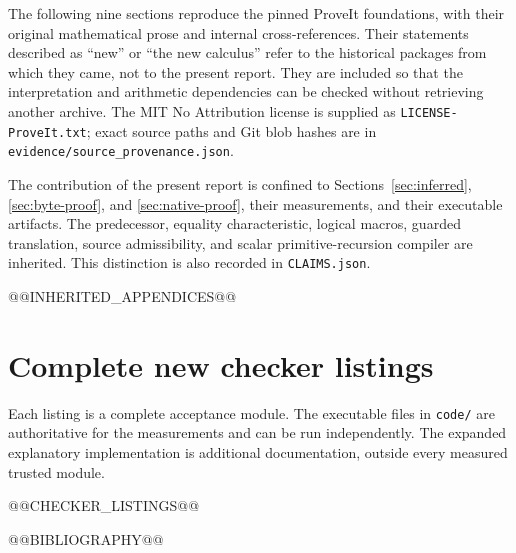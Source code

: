 The following nine sections reproduce the pinned ProveIt foundations,
with their original mathematical prose and internal cross-references.
Their statements described as ``new'' or ``the new calculus'' refer to
the historical packages from which they came, not to the present report.
They are included so that the interpretation and arithmetic dependencies
can be checked without retrieving another archive. The MIT No Attribution
license is supplied as \texttt{LICENSE-ProveIt.txt}; exact source paths and
Git blob hashes are in \texttt{evidence/source\_provenance.json}.

The contribution of the present report is confined to
Sections~\ref{sec:inferred}, \ref{sec:byte-proof}, and
\ref{sec:native-proof}, their measurements, and their executable artifacts.
The predecessor, equality characteristic, logical macros, guarded
translation, source admissibility, and scalar primitive-recursion
compiler are inherited. This distinction is also recorded in
\texttt{CLAIMS.json}.

@@INHERITED_APPENDICES@@

\clearpage
\section{Complete new checker listings}
\label{sec:listings}

Each listing is a complete acceptance module. The executable files in
\texttt{code/} are authoritative for the measurements and can be run
independently. The expanded explanatory implementation is additional
documentation, outside every measured trusted module.

@@CHECKER_LISTINGS@@

@@BIBLIOGRAPHY@@
